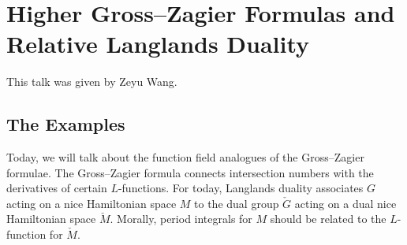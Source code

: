 \documentclass{article}
\begin{document}
\section{Higher Gross--Zagier Formulas and Relative Langlands Duality}
This talk was given by Zeyu Wang.

\subsection{The Examples}
Today, we will talk about the function field analogues of the Gross--Zagier formulae. The Gross--Zagier formula connects intersection numbers with the derivatives of certain $L$-functions. For today, Langlands duality associates $G$ acting on a nice Hamiltonian space $M$ to the dual group $\check G$ acting on a dual nice Hamiltonian space $\check M$. Morally, period integrals for $M$ should be related to the $L$-function for $\check M$.
\end{document}
